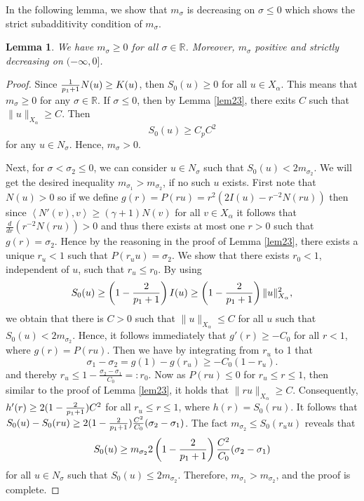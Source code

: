 \documentclass[10pt]{article}
\numberwithin{equation}{section}
\newtheorem{lemma}[theorem]{\quad Lemma}
\newcommand{\al}{\alpha}
\newcommand{\rr}{\mathbb{R}}
\begin{document}
	In the following lemma, we show that $m_\sigma$ is decreasing on $\sigma\leq0$ which shows the strict subadditivity condition of $m_\sigma$.
	\begin{lemma}
		We have $m_\sigma\geq0$ for all $\sigma\in\rr$. Moreover,   $m_\sigma$ positive and strictly decreasing on $(-\infty,0]$.
	\end{lemma}
	\begin{proof}
		Since $\frac{1}{{p_1}+1}N(u)\geq K(u)$, then $S_0(u)\geq0$ for all $u\in X_\al$. This means that $m_\sigma\geq0$ for any $\sigma\in\rr$. If $\sigma\leq 0$, then by Lemma \ref{lem23}, there exits $C$ such that $\|u\|_{X_\al}\geq C$. Then 
		\[
		S_0(u)\geq C_{p}C^2
		\]
		for any $u\in N_\sigma$. Hence, $m_\sigma>0$.
		
		Next, for $\sigma<\sigma_2\leq0$, we can consider $u\in N_\sigma$ such that $S_0(u)<2m_{\sigma_2}$. We will get the desired inequality $m_{\sigma_1}>m_{\sigma_2}$, if no such $u$  exists. First note that $N(u)>0$ so if we define $g(r)=P(ru)=r^2(2I(u)-r^{-2}N(ru))$ then since $\left<N'(v),v\right>\geq(\gamma+1)N(v)$ for all $v\in X_\al$ it follows that $\frac{d}{dr}(r^{-2}N(ru))>0$ and thus there exists at most one $r>0$ such that $g(r)=\sigma_2$. Hence by the reasoning in the proof of Lemma \ref{lem23}, there exists a unique $r_u<1$ such that $P(r_uu)=\sigma_2$. We show that there exists $r_0<1$, independent of $u$, such that $r_u\leq r_0$. By using 
		\[
		S_0(u)\geq\left(1-\frac2{\po+1}\right)I(u)\geq
		\left(1-\frac2{\po+1}\right)\|u\|_{X_\al}^2,
		\]
		we obtain that there is $C>0$ such that $\|u\|_{X_\al}\leq C$ for all $u$ such that $S_0(u)<2m_{\sigma_2}$. Hence, it follows immediately that $g'(r)\geq- C_0$ for all $r<1$, where $g(r)=P(ru)$. Then we have by integrating from $r_u$ to 1 that 
		\[
		\sigma_1-\sigma_2=g(1)-g(r_u)\geq -C_0(1-r_u).
		\]
		and thereby $r_u\leq1-\frac{\sigma_2-\sigma_1}{C_0}=:r_0$.
		Now as $P(ru)\leq0$ for $r_u\leq r\leq1$, then similar to the proof of Lemma \ref{lem23}, it holds that $\|ru\|_{X_\al}\geq C$. Consequently, $h'(r)\geq2(1-\frac2{{p_1}+1}) C^2$ for all $r_u\leq r\leq 1$, where $h(r)=S_0(ru)$. It follows that $S_0(u)-S_0(ru)\geq 2(1-\frac2{{p_1}+1}) \frac{C^2}{C_0}(\sigma_2-\sigma_1)$. The fact $m_{\sigma_2}\leq S_0(r_uu)$ reveals that $$S_0(u)\geq m_{\sigma_2}2\left(1-\frac2{{p_1}+1}\right) \frac{C^2}{C_0}(\sigma_2-\sigma_1)$$
		for all $u\in N_\sigma$ such that $S_0(u)\leq 2m_{\sigma_2}$. Therefore, $m_{\sigma_1}>m_{\sigma_2}$, and the proof is complete.
	\end{proof}
	
\end{document}
